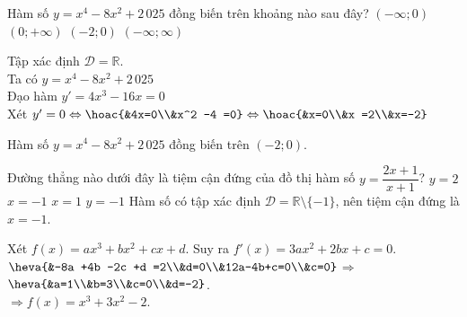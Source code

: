 \begin{ex}%
Hàm số $y = x^4 - 8x^2 +2\,025$ đồng biến trên khoảng nào sau đây?
\choice
{$(-\infty; 0)$}
{$(0; + \infty)$}
{\True $(-2;0)$}
{$(-\infty;\infty)$}
\loigiai 
{Tập xác định $\mathscr{D} =\mathbb{R}$.\\
Ta có $y = x^4 - 8x^2 +2\,025$\\
Đạo hàm $y' = 4x^3 - 16x=0$\\
Xét $y'=0\Leftrightarrow \hoac{&4x=0\\&x^2 -4 =0}\Leftrightarrow \hoac{&x=0\\&x =2\\&x=-2}$
\begin{center}
\end{center}
Hàm số $y = x^4 - 8x^2 +2\,025$ đồng biến trên $(-2;0)$.
}
\end{ex}

\begin{ex}%
Đường thẳng nào dưới đây là tiệm cận đứng của đồ thị hàm số $y = \dfrac{2x+1}{x+1}$?
\choice
{$y=2$}
{\True $x=-1$}
{$x=1$}
{$y=-1$}
\loigiai
{Hàm số có tập xác định $\mathscr{D} = \mathbb{R} \setminus \{-1\}$, nên tiệm cận đứng là $x=-1$.}
\end{ex}

\begin{ex}%
	\loigiai
	{
	Xét $f(x) = ax^3 + bx^2 + cx +d $. Suy ra $f'(x) = 3ax^2 + 2bx + c =0$.\\
	$\heva{&-8a +4b -2c +d =2\\&d=0\\&12a-4b+c=0\\&c=0}$$\Rightarrow$$\heva{&a=1\\&b=3\\&c=0\\&d=-2}$.\\
	$\Rightarrow f(x)=x^3 + 3x^2 -2$.
	}
\end{ex}

